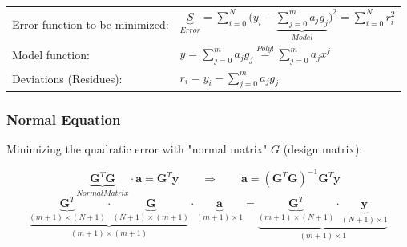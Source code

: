 \begin{minipage}[c]{12.5cm}
	\begin{tabular}{ll}
		Error function to be minimized:
		&$\boxed{\underbrace{S}_{Error}=\sum\limits_{i=0}^{N}{\big(y_i - \underbrace{\sum\limits_{j=0}^{m}{a_j g_j}}_{Model}\big)^2} = \sum\limits_{i=0}^{N}{ r_i^2}}$\\
		Model function:
		&$\boxed{y=\sum\limits_{j=0}^{m}{a_j g_j}}\overset{Poly!}{=}\sum\limits_{j=0}^{m}{a_j x^j}$\\
		Deviations (Residues):
		&$r_i=y_i-\sum\limits_{j=0}^{m}{a_j g_j}$
	\end{tabular}

	\subsubsection{Normal Equation}

	Minimizing the quadratic error with "normal matrix" \(G\) (design matrix):

	$$\underbrace{\bm{G}^T \bm{G}}_{Normal Matrix}\cdot \bm{a} = \bm{G}^T \bm{y} \qquad \Rightarrow \qquad \bm{a}=(\bm{G}^T \bm{G})^{-1}\bm{G}^T \bm{y}$$
	$$\underbrace{\underbrace{\bm{G}^T}_{(m+1)\times(N+1)} \cdot \underbrace{\bm{G}}_{(N+1)\times(m+1)}}_{(m+1)\times(m+1)}\cdot
	  \underbrace{\bm{a}}_{(m+1)\times 1}=
	  \underbrace{\underbrace{\bm{G}^T}_{(m+1)\times(N+1)}\cdot\underbrace{\bm{y}}_{(N+1)\times 1}}_{(m+1)\times 1}$$
\end{minipage}
\hfill
